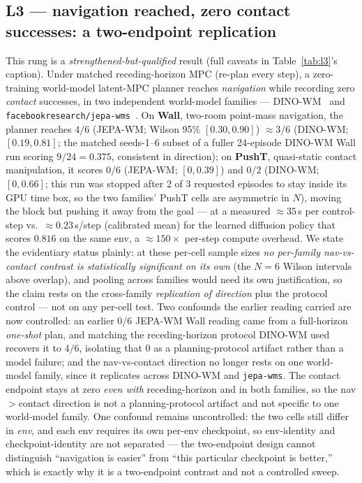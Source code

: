 \documentclass[10pt]{article}
\begin{document}
\subsection{L3 --- navigation reached, zero contact successes: a
two-endpoint replication}
\label{sec:l3}
This rung is a \emph{strengthened-but-qualified} result (full caveats in
Table~\ref{tab:l3}'s caption). Under matched receding-horizon MPC (re-plan
every step), a zero-training world-model latent-MPC planner reaches
\emph{navigation} while recording zero \emph{contact} successes, in two
independent world-model families --- DINO-WM~\cite{zhou2024dinowm} and
\texttt{facebookresearch/jepa-wms}~\cite{assran2025vjepa2}. On
\textbf{Wall}, two-room point-mass navigation, the planner reaches $4/6$
(JEPA-WM; Wilson 95\% $[0.30, 0.90]$) $\approx 3/6$ (DINO-WM; $[0.19,
0.81]$; the matched seeds-1--6 subset of a fuller 24-episode DINO-WM Wall
run scoring $9/24{=}0.375$, consistent in direction); on \textbf{PushT}, quasi-static contact manipulation, it scores
$0/6$ (JEPA-WM; $[0, 0.39]$) and $0/2$ (DINO-WM; $[0, 0.66]$; this run was
stopped after 2 of 3 requested episodes to stay inside its GPU time box, so
the two families' PushT cells are asymmetric in $N$), moving the block but
pushing it away from the goal --- at a measured ${\approx}35$\,s per
control-step vs.\ ${\approx}0.23$\,s/step (calibrated mean) for the
learned diffusion policy that scores $0.816$ on the same env, a
${\approx}150\times$ per-step compute overhead. We state the evidentiary
status plainly: at these per-cell sample sizes \emph{no per-family
nav-vs-contact contrast is statistically significant on its own} (the
$N{=}6$ Wilson intervals above overlap), and pooling across families would
need its own justification, so the claim rests on the cross-family
\emph{replication of direction} plus the protocol control --- not on any
per-cell test. Two confounds
the earlier reading carried are now controlled: an earlier $0/6$ JEPA-WM
Wall reading came from a full-horizon \emph{one-shot} plan, and matching
the receding-horizon protocol DINO-WM used recovers it to $4/6$, isolating
that $0$ as a planning-protocol artifact rather than a model failure; and
the nav-vs-contact direction no longer rests on one world-model family,
since it replicates across DINO-WM and \texttt{jepa-wms}. The contact
endpoint stays at zero \emph{even with} receding-horizon and in both
families, so the nav$>$contact direction is not a planning-protocol
artifact and not specific to one world-model family. One confound remains
uncontrolled: the two cells still
differ in \emph{env}, and each env requires its own per-env checkpoint, so
env-identity and checkpoint-identity are not separated --- the two-endpoint
design cannot distinguish ``navigation is easier'' from ``this particular
checkpoint is better,'' which is exactly why it is a two-endpoint contrast
and not a controlled sweep.
\end{document}
